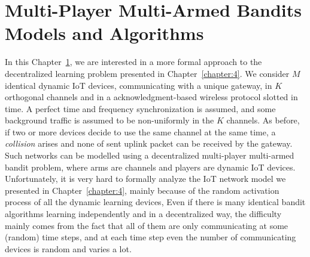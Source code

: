 
\chapter[Multi-Player Multi-Armed Bandits Models]{Multi-Player Multi-Armed Bandits Models and Algorithms}
\label{chapter:5}
\minitoc

In this Chapter~\ref{chapter:5}, we are interested in a more formal approach to the decentralized learning problem presented in Chapter~\ref{chapter:4}.
We consider $M$ identical dynamic IoT devices, communicating with a unique gateway, in $K$ orthogonal channels and in a acknowledgment-based wireless protocol slotted in time.
A perfect time and frequency synchronization is assumed,
and some \iid{} background traffic is assumed to be non-uniformly in the $K$ channels.
As before, if two or more devices decide to use the same channel at the same time, a \emph{collision} arises and none of sent uplink packet can be received by the gateway.
%
Such networks can be modelled using a decentralized multi-player multi-armed bandit problem, where arms are channels and players are dynamic IoT devices.
Unfortunately, it is very hard to formally analyze the IoT network model we presented in Chapter~\ref{chapter:4}, mainly because of the random activation process of all the dynamic learning devices, Even if there is many identical bandit algorithms learning independently and in a decentralized way, the difficulty mainly comes from the fact that all of them are only communicating at some (random) time steps, and at each time step even the number of communicating devices is random and varies a lot.

